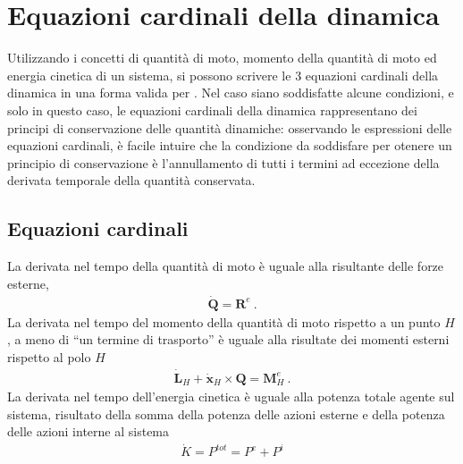 \documentclass[letterpaper,10pt,english]{jupyterBook}
\begin{document}
\section{Equazioni cardinali della dinamica}
\label{\detokenize{ch/dynamics-eom:equazioni-cardinali-della-dinamica}}\label{\detokenize{ch/dynamics-eom:classical-mechanics-dynamics-eom}}\label{\detokenize{ch/dynamics-eom::doc}}
\sphinxAtStartPar
Utilizzando i concetti di quantità di moto, momento della quantità di moto ed energia cinetica di un sistema, si possono scrivere le 3 equazioni cardinali della dinamica in una forma valida per . Nel caso siano soddisfatte alcune condizioni, e solo in questo caso, le equazioni cardinali della dinamica rappresentano dei principi di conservazione delle quantità dinamiche: osservando le espressioni delle equazioni cardinali, è facile intuire che la condizione da soddisfare per otenere un principio di conservazione è l’annullamento di tutti i termini ad eccezione della derivata temporale della quantità conservata.


\subsection{Equazioni cardinali}
\label{\detokenize{ch/dynamics-eom:equazioni-cardinali}}
\sphinxAtStartPar
{} La derivata nel tempo della quantità di moto è uguale alla risultante delle forze esterne,
\begin{equation}\label{equation:ch/dynamics-eom:principle:q}
\begin{split}\dot{\mathbf{Q}} = \mathbf{R}^e \ .\end{split}
\end{equation}
\sphinxAtStartPar
{} La derivata nel tempo del momento della quantità di moto rispetto a un punto \(H\), a meno di “un termine di trasporto” è uguale alla risultate dei momenti esterni rispetto al polo \(H\)
\begin{equation}\label{equation:ch/dynamics-eom:principle:l}
\begin{split}\dot{\mathbf{L}}_H + \dot{\mathbf{x}}_H \times \mathbf{Q} = \mathbf{M}_H^e \ .\end{split}
\end{equation}
\sphinxAtStartPar
{} La derivata nel tempo dell’energia cinetica è uguale alla potenza totale agente sul sistema, risultato della somma della potenza delle azioni esterne e della potenza delle azioni interne al sistema
\begin{equation}\label{equation:ch/dynamics-eom:principle:k}
\begin{split}\dot{K} = P^{tot} = P^e + P^i\end{split}
\end{equation}
\end{document}
